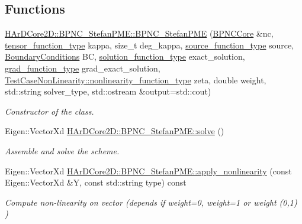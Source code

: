 \subsection*{Functions}
\begin{DoxyCompactItemize}
\item 
\hyperlink{group__BPNC_ga85e80578aa553215feae11284549b354}{H\+Ar\+D\+Core2\+D\+::\+B\+P\+N\+C\+\_\+\+Stefan\+P\+M\+E\+::\+B\+P\+N\+C\+\_\+\+Stefan\+P\+ME} (\hyperlink{classHArDCore2D_1_1BPNCCore}{B\+P\+N\+C\+Core} \&nc, \hyperlink{classHArDCore2D_1_1BPNC__StefanPME_aa07717e39892228c331b3cf3c29b086e}{tensor\+\_\+function\+\_\+type} kappa, size\+\_\+t deg\+\_\+kappa, \hyperlink{classHArDCore2D_1_1BPNC__StefanPME_a233ff438d25c93b72498ce3b461c8623}{source\+\_\+function\+\_\+type} source, \hyperlink{classBoundaryConditions}{Boundary\+Conditions} BC, \hyperlink{classHArDCore2D_1_1BPNC__StefanPME_ad0802f467317597f803c0dd45d26c3ba}{solution\+\_\+function\+\_\+type} exact\+\_\+solution, \hyperlink{classHArDCore2D_1_1BPNC__StefanPME_a33d159dc2e762c21926b85a21e38c5d8}{grad\+\_\+function\+\_\+type} grad\+\_\+exact\+\_\+solution, \hyperlink{classTestCaseNonLinearity_a3d8a5c89c517dd0d9c835b7441ee9b07}{Test\+Case\+Non\+Linearity\+::nonlinearity\+\_\+function\+\_\+type} zeta, double weight, std\+::string solver\+\_\+type, std\+::ostream \&output=std\+::cout)
\begin{DoxyCompactList}\small\item\em Constructor of the class. \end{DoxyCompactList}\item 
\mbox{\label{group__BPNC_ga8729ab99cd04c0ef4c6b2556805d1e8d}} 
Eigen\+::\+Vector\+Xd \hyperlink{group__BPNC_ga8729ab99cd04c0ef4c6b2556805d1e8d}{H\+Ar\+D\+Core2\+D\+::\+B\+P\+N\+C\+\_\+\+Stefan\+P\+M\+E\+::solve} ()
\begin{DoxyCompactList}\small\item\em Assemble and solve the scheme. \end{DoxyCompactList}\item 
\mbox{\label{group__BPNC_ga1d2805e0b077ec85e8530cf5e2b11be5}} 
Eigen\+::\+Vector\+Xd \hyperlink{group__BPNC_ga1d2805e0b077ec85e8530cf5e2b11be5}{H\+Ar\+D\+Core2\+D\+::\+B\+P\+N\+C\+\_\+\+Stefan\+P\+M\+E\+::apply\+\_\+nonlinearity} (const Eigen\+::\+Vector\+Xd \&Y, const std\+::string type) const
\begin{DoxyCompactList}\small\item\em Compute non-\/linearity on vector (depends if weight=0, weight=1 or weight (0,1) ) \end{DoxyCompactList}\item 

\end{DoxyCompactItemize}
